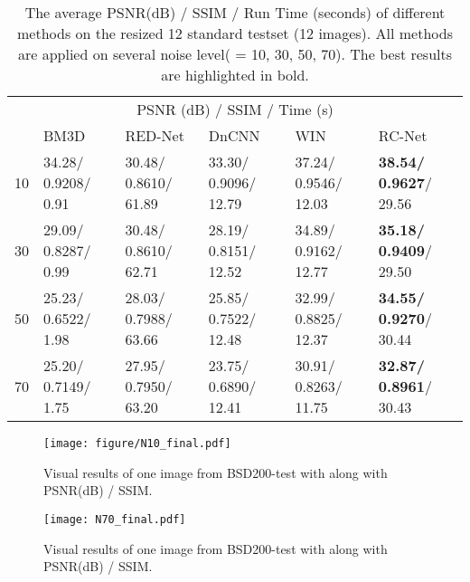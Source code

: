 \documentclass[10pt,twocolumn,letterpaper]{article}
\begin{document}
\begin{table*}[!]
\small
  \caption{ The average PSNR(dB) / SSIM / Run Time (seconds)  of different methods on the resized 12 standard testset (12 images). All methods are applied on several noise level( = 10, 30, 50, 70). The best results are highlighted in bold.}
  \label{tab:Set12-test}
  \centering
  \begin{tabular}{llllll}
    \toprule
  \multicolumn{6}{c}{PSNR (dB) / SSIM / Time (s)}                   \\
    \cmidrule{1-6}
     & BM3D \cite{dabov2009bm3d}   & RED-Net \cite{mao2016image} & DnCNN \cite{zhang2016beyond} &  WIN~\cite{DBLP:journals/corr/LiuF17}  &  RC-Net\\
     
    \midrule
    10  & 34.28/ 0.9208/ 0.91  & 30.48/ 0.8610/ 61.89   & 33.30/ 0.9096/ 12.79  &  37.24/ 0.9546/ 12.03  & \textbf {38.54/ 0.9627}/ 29.56\\
    30  & 29.09/ 0.8287/ 0.99  & 30.48/ 0.8610/ 62.71   & 28.19/ 0.8151/ 12.52  &  34.89/ 0.9162/ 12.77  & \textbf {35.18/ 0.9409}/ 29.50\\
    50  & 25.23/ 0.6522/ 1.98  & 28.03/ 0.7988/ 63.66   & 25.85/ 0.7522/ 12.48  &  32.99/ 0.8825/ 12.37  & \textbf {34.55/ 0.9270}/ 30.44\\
    70  & 25.20/ 0.7149/ 1.75  & 27.95/ 0.7950/ 63.20   & 23.75/ 0.6890/ 12.41  &  30.91/ 0.8263/ 11.75  & \textbf {32.87/ 0.8961}/ 30.43\\
    \bottomrule

  \end{tabular}
  \vspace{0.15 em}
\end{table*}

\begin{figure*}[!]
 \vspace{-1em}
  \centering
  \texttt{[image: figure/N10\_final.pdf]}
  \caption{\small Visual results of one image from BSD200-test with 
  along with PSNR(dB) / SSIM.}
  \vspace{0.3 em}
\label{fig:N10}
\end{figure*}

\begin{figure*}[!]
 \vspace{-1em}
\centering
  \texttt{[image: N70\_final.pdf]}
  \caption{\small Visual results of one image from BSD200-test with 
  along with PSNR(dB) / SSIM.}
  \vspace{0.1 em}
\label{fig:N70}
\end{figure*}
\end{document}
